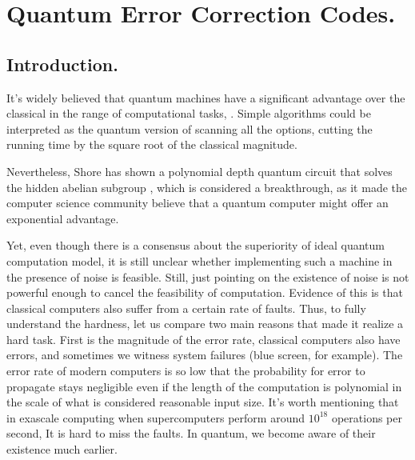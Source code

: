 \chapter{Quantum Error Correction Codes.}
\section{Introduction.}
It's widely believed that quantum machines have a significant advantage over the classical in the range of computational tasks\cite{grover1996fast}, \cite{ahuja1999quantum}. Simple algorithms could be interpreted as the quantum version of scanning all the options, cutting the running time by the square root of the classical magnitude. 

Nevertheless, Shore has shown a polynomial depth quantum circuit that solves the hidden abelian subgroup \cite{Shor_1997}, which is considered a breakthrough, as it made the computer science community believe that a quantum computer might offer an exponential advantage.

Yet, even though there is a consensus about the superiority of ideal quantum computation model, it is still unclear whether implementing such a machine in the presence of noise is feasible.   
Still, just pointing on the existence of noise is not powerful enough to cancel the feasibility of computation. Evidence of this is that classical computers also suffer from a certain rate of faults. Thus, to fully understand the hardness, let us compare two main reasons that made it realize a hard task. 
First is the magnitude of the error rate, classical computers also have errors, and sometimes we witness system failures (blue screen, for example). The error rate of modern computers is so low that the probability for error to propagate stays negligible even if the length of the computation is polynomial in the scale of what is considered reasonable input size. It's worth mentioning that in exascale computing when supercomputers perform around $10^{18}$ operations per second, It is hard to miss the faults. In quantum, we become aware of their existence much earlier.      

